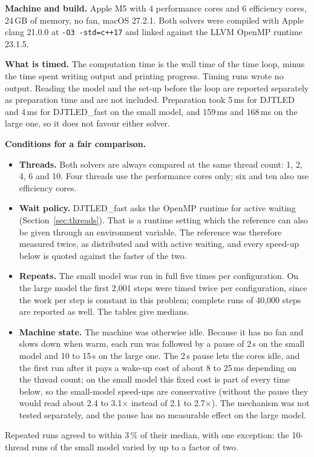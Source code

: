 \documentclass[11pt,a4paper]{article}
\newcommand{\DJF}{DJTLED\_fast}
\newcommand{\code}[1]{\texttt{#1}}
\begin{document}
\textbf{Machine and build.} Apple M5 with 4 performance cores and 6 efficiency cores, 24\,GB of memory, no fan, macOS 27.2.1. Both solvers were compiled with Apple clang 21.0.0 at \code{-O3 -std=c++17} and linked against the LLVM OpenMP runtime 23.1.5.

\textbf{What is timed.} The computation time is the wall time of the time loop, minus the time spent writing output and printing progress. Timing runs wrote no output. Reading the model and the set-up before the loop are reported separately as preparation time and are not included. Preparation took 5\,ms for DJTLED and 4\,ms for \DJF{} on the small model, and 159\,ms and 168\,ms on the large one, so it does not favour either solver.

\textbf{Conditions for a fair comparison.}
\begin{itemize}
\item \textbf{Threads.} Both solvers are always compared at the same thread count: 1, 2, 4, 6 and 10. Four threads use the performance cores only; six and ten also use efficiency cores.
\item \textbf{Wait policy.} \DJF{} asks the OpenMP runtime for active waiting (Section~\ref{sec:threads}). That is a runtime setting which the reference can also be given through an environment variable. The reference was therefore measured twice, as distributed and with active waiting, and every speed-up below is quoted against the faster of the two.
\item \textbf{Repeats.} The small model was run in full five times per configuration. On the large model the first 2,001 steps were timed twice per configuration, since the work per step is constant in this problem; complete runs of 40,000 steps are reported as well. The tables give medians.
\item \textbf{Machine state.} The machine was otherwise idle. Because it has no fan and slows down when warm, each run was followed by a pause of 2\,s on the small model and 10 to 15\,s on the large one. The 2\,s pause lets the cores idle, and the first run after it pays a wake-up cost of about 8 to 25\,ms depending on the thread count; on the small model this fixed cost is part of every time below, so the small-model speed-ups are conservative (without the pause they would read about 2.4 to 3.1$\times$ instead of 2.1 to 2.7$\times$). The mechanism was not tested separately, and the pause has no measurable effect on the large model.
\end{itemize}
Repeated runs agreed to within 3\,\% of their median, with one exception: the 10-thread runs of the small model varied by up to a factor of two.
\end{document}
